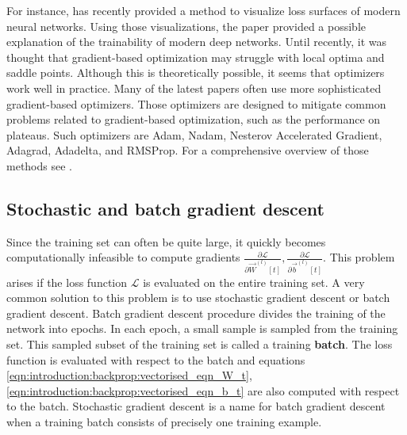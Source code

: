 For instance, \cite{li_2018_visualizing} has recently provided a method to visualize loss surfaces of modern neural networks. Using those visualizations, the paper provided a possible explanation of the trainability of modern deep networks. Until recently, it was thought that gradient-based optimization may struggle with local optima and saddle points. Although this is theoretically possible, it seems that optimizers work well in practice. \newpage Many of the latest papers often use more sophisticated gradient-based optimizers. Those optimizers are designed to mitigate common problems related to gradient-based optimization, such as the performance on plateaus. Such optimizers are Adam, Nadam, Nesterov Accelerated Gradient, Adagrad, Adadelta, and RMSProp. For a comprehensive overview of those methods see \cite{ruder_2017_an}.
\subsection{Stochastic and batch gradient descent}
Since the training set can often be quite large, it quickly becomes computationally infeasible to compute gradients $\frac{\partial \mathcal{L}}{\partial \vec{W}^{(l)}[t]}, \frac{\partial \mathcal{L}}{\partial \vec{b}^{(l)}[t]}$. This problem arises if the loss function $\mathcal{L}$ is evaluated on the entire training set. A very common solution to this problem is to use stochastic gradient descent or batch gradient descent. Batch gradient descent procedure divides the training of the network into epochs. In each epoch, a small sample is sampled from the training set. This sampled subset of the training set is called a training \textbf{batch}. The loss function is evaluated with respect to the batch and equations \ref{eqn:introduction:backprop:vectorised_eqn_W_t}, \ref{eqn:introduction:backprop:vectorised_eqn_b_t} are also computed with respect to the batch. Stochastic gradient descent is a name for batch gradient descent when a training batch consists of precisely one training example.

